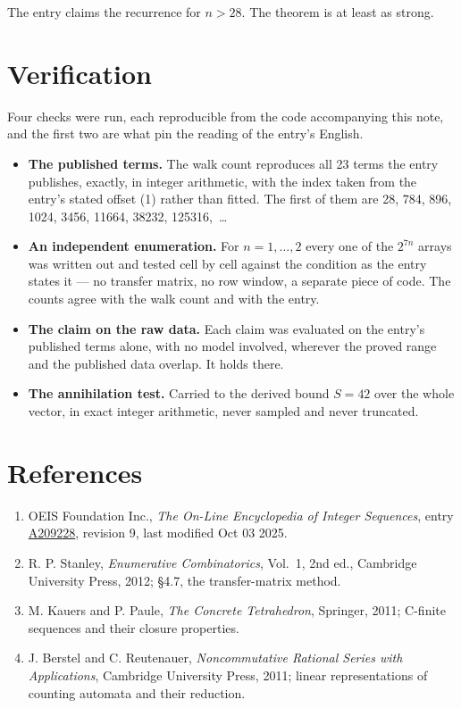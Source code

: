 \documentclass[11pt]{article}
\theoremstyle{definition}
\begin{document}
The entry claims the recurrence for $n > 28$. The theorem is at least as strong.

\section{Verification}

Four checks were run, each reproducible from the code accompanying this note, and the first two are what pin the reading of the entry's English.

\begin{itemize}

\item {\bfseries The published terms.} The walk count reproduces all 23 terms the entry publishes, exactly, in integer arithmetic, with the index taken from the entry's stated offset (1) rather than fitted. The first of them are 28, 784, 896, 1024, 3456, 11664, 38232, 125316,~\dots

\item {\bfseries An independent enumeration.} For $n = 1,\dots,2$ every one of the $2^{7n}$ arrays was written out and tested cell by cell against the condition as the entry states it --- no transfer matrix, no row window, a separate piece of code. The counts agree with the walk count and with the entry.

\item {\bfseries The claim on the raw data.} Each claim was evaluated on the entry's published terms alone, with no model involved, wherever the proved range and the published data overlap. It holds there.

\item {\bfseries The annihilation test.} Carried to the derived bound $S = 42$ over the whole vector, in exact integer arithmetic, never sampled and never truncated.

\end{itemize}

\section{References}

\begin{enumerate}

\item OEIS Foundation Inc., \emph{The On-Line Encyclopedia of Integer Sequences}, entry \href{https://oeis.org/A209228}{A209228}, revision 9, last modified Oct 03 2025.

\item R. P. Stanley, \emph{Enumerative Combinatorics}, Vol.~1, 2nd ed., Cambridge University Press, 2012; \S4.7, the transfer-matrix method.

\item M. Kauers and P. Paule, \emph{The Concrete Tetrahedron}, Springer, 2011; C-finite sequences and their closure properties.

\item J. Berstel and C. Reutenauer, \emph{Noncommutative Rational Series with Applications}, Cambridge University Press, 2011; linear representations of counting automata and their reduction.

\end{enumerate}
\end{document}
